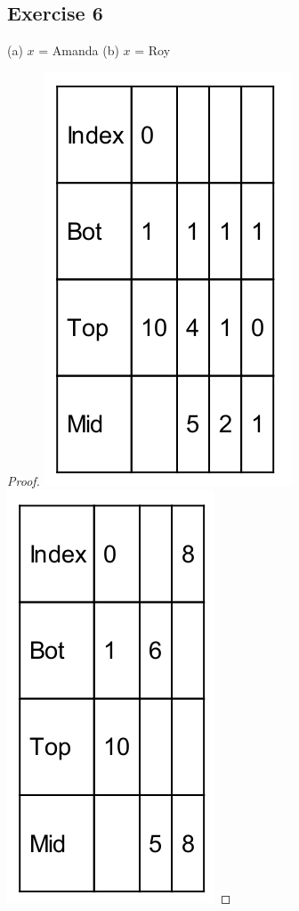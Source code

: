 \documentclass[14pt]{extarticle}
\begin{document}
\subsection{Exercise 6}
(a) \(x\) = Amanda (b) \(x\) = Roy
\begin{proof}
    \includegraphics[scale=0.3]{../images/11.5.6.a.png}
    \includegraphics[scale=0.3]{../images/11.5.6.b.png}
\end{proof}
\end{document}
